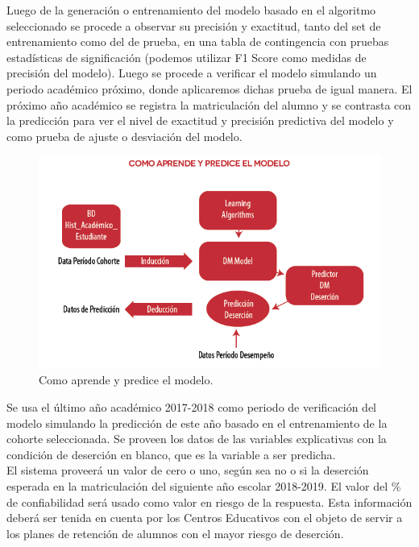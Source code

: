 \documentclass[12pt]{article}
\begin{document}
Luego de la generación o entrenamiento del modelo basado en el algoritmo seleccionado se procede a observar su precisión y exactitud, tanto del set de entrenamiento como del de prueba, en una tabla de contingencia con pruebas estadísticas de significación (podemos utilizar F1 Score como medidas de precisión del modelo). Luego se procede a verificar el modelo simulando un periodo académico próximo, donde aplicaremos dichas prueba de igual manera. El próximo año académico se registra la matriculación del alumno y se contrasta con la predicción para ver el nivel de exactitud y precisión predictiva del modelo y como prueba de ajuste o desviación del modelo.\\

\begin{figure}[!h]
\centering
\includegraphics[width=6.0in]{learn.PNG}
\caption{Como aprende y predice el modelo.}
\end{figure}

Se usa el último año académico 2017-2018 como periodo de verificación del modelo simulando la predicción de este año basado en el entrenamiento de la cohorte seleccionada. Se proveen los datos de las variables explicativas con la condición de deserción en blanco, que es la variable a ser predicha.\\
El sistema proveerá un valor de cero o uno, según sea no o si la deserción esperada en la matriculación del siguiente año escolar 2018-2019. El valor del \% de confiabilidad será usado como valor en riesgo de la respuesta. Esta información deberá ser tenida en cuenta por los Centros Educativos con el objeto de servir a los planes de retención de alumnos con el mayor riesgo de deserción.
\end{document}

